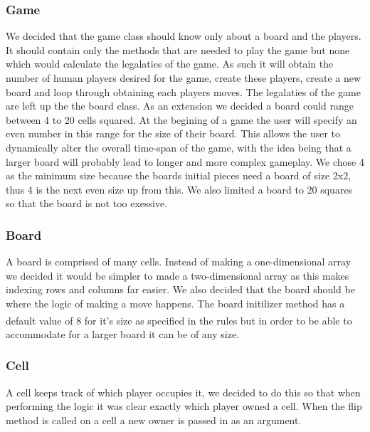 \documentclass[a4wide, 11pt]{article}
\begin{document}
  \subsubsection{Game}
  We decided that the game class should know only about a board and the players. It should contain only the methods that are needed to play the game but none which 
  would calculate the legalaties of the game. As such it will obtain the number of human players desired for the game, create these players, create a new board and
  loop through obtaining each players moves. The legalaties of the game are left up the the board class. As an extension we decided a board could range between 4 to
  20 cells squared. At the begining of a game the user will specify an even number in this range for the size of their board. This allows the user to dynamically
  alter the overall time-span of the game, with the idea being that a larger board will probably lead to longer and more complex gameplay.  We chose 4 as the minimum
  size because the boards initial pieces need a board of size 2x2, thus 4 is the next even size up from this. We also limited a board to 20 squares so that the board
  is not too exessive. 
  \subsubsection{Board}
  A board is comprised of many cells. Instead of making a one-dimensional array we decided it would be simpler to made a two-dimensional array as this makes indexing 
  rows and columns far easier. We also decided that the board should be where the logic of making a move happens. The board initilizer method has a default value of 8 
  for it's size as specified in the rules \textsuperscript{\cite{wikiothello}} but in order to be able to accommodate for a larger board it can be of any size.

  \subsubsection{Cell}
  A cell keeps track of which player occupies it, we decided to do this so that when performing the logic it was clear exactly which player owned a cell. When the 
  flip method is called on a cell a new owner is passed in as an argument.
\end{document}
